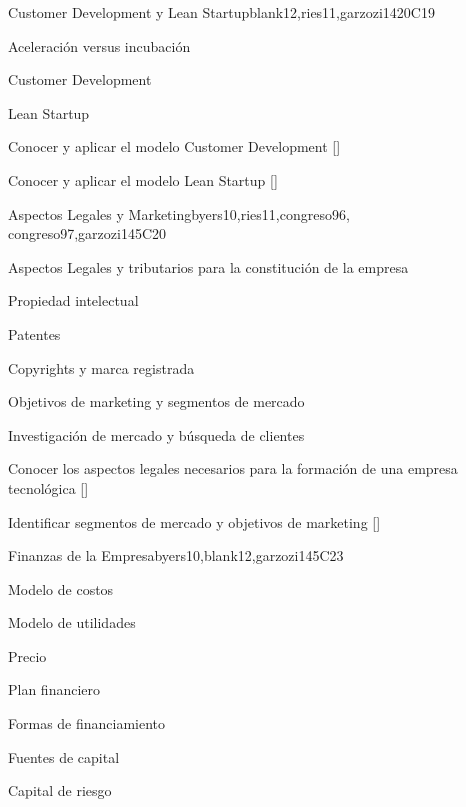 \begin{syllabus}
   \begin{unit}{}{Customer Development y Lean Startup}{blank12,ries11,garzozi14}{20}{C19}
      \begin{topics}
         \item Aceleración versus incubación  
         \item Customer Development
         \item Lean Startup 
      \end{topics}
   
      \begin{learningoutcomes} 
         \item Conocer y aplicar el modelo Customer Development  [\Usage]
         \item Conocer y aplicar el modelo Lean Startup  [\Usage]
       \end{learningoutcomes} 
   \end{unit}
   
   \begin{unit}{}{Aspectos Legales y Marketing}{byers10,ries11,congreso96, congreso97,garzozi14}{5}{C20}
      \begin{topics}
        \item Aspectos Legales y tributarios para la constitución de la empresa
         \item Propiedad intelectual
         \item Patentes
         \item Copyrights y marca registrada
         \item Objetivos de marketing  y segmentos de mercado
         \item Investigación de mercado y búsqueda de clientes
      \end{topics}
   
     \begin{learningoutcomes} 
         \item Conocer los aspectos legales necesarios para la formación de una empresa tecnológica  [\Familiarity]
         \item Identificar segmentos de mercado y objetivos de marketing     [\Familiarity]
      \end{learningoutcomes} 
   \end{unit}
   
   \begin{unit}{}{Finanzas de la Empresa}{byers10,blank12,garzozi14}{5}{C23}
      \begin{topics}
         \item Modelo de costos
         \item Modelo de utilidades
         \item Precio
         \item Plan financiero
         \item Formas de financiamiento
         \item Fuentes de capital
         \item Capital de riesgo
      \end{topics}
   

\end{unit}
\end{syllabus}
